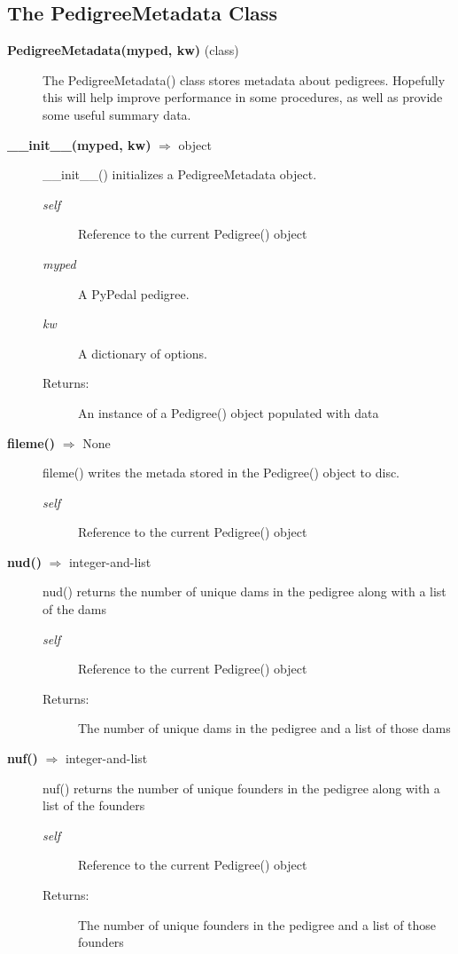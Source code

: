 \subsection*{The PedigreeMetadata Class}
\begin{description}
\item[\textbf{PedigreeMetadata(myped, kw)} (class)]
The PedigreeMetadata() class stores metadata about pedigrees. Hopefully this will help improve performance in some procedures, as well as provide some useful summary data.

\item[\textbf{\_\_init\_\_(myped, kw)} $\Rightarrow$ object]
\_\_init\_\_() initializes a PedigreeMetadata object.
\begin{description}
\item[\emph{self}] Reference to the current Pedigree() object
\item[\emph{myped}] A PyPedal pedigree.
\item[\emph{kw}] A dictionary of options.
\item[Returns:] An instance of a Pedigree() object populated with data
\end{description}

\item[\textbf{fileme()} $\Rightarrow$ None]
fileme() writes the metada stored in the Pedigree() object to disc.
\begin{description}
\item[\emph{self}] Reference to the current Pedigree() object
\end{description}

\item[\textbf{nud()} $\Rightarrow$ integer-and-list]
nud() returns the number of unique dams in the pedigree along with a list of the dams
\begin{description}
\item[\emph{self}] Reference to the current Pedigree() object
\item[Returns:] The number of unique dams in the pedigree and a list of those dams
\end{description}

\item[\textbf{nuf()} $\Rightarrow$ integer-and-list]
nuf() returns the number of unique founders in the pedigree along with a list of the founders
\begin{description}
\item[\emph{self}] Reference to the current Pedigree() object
\item[Returns:] The number of unique founders in the pedigree and a list of those founders
\end{description}


\end{description}
